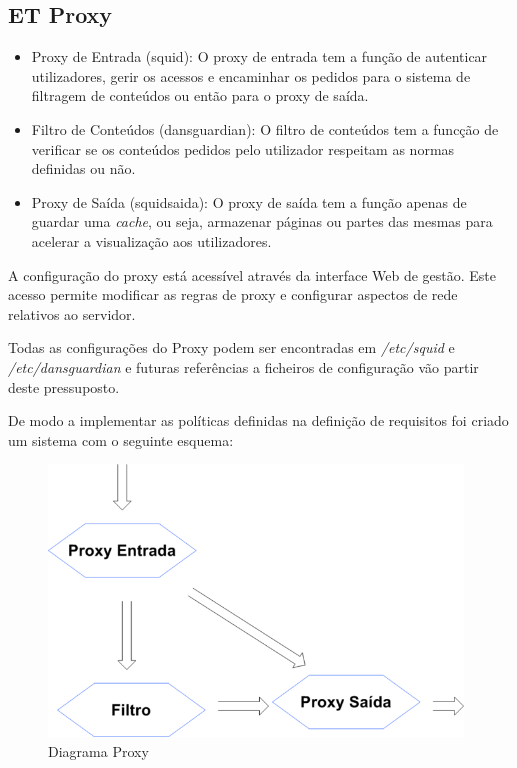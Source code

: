 \subsection{ET Proxy}
\begin{itemize}
	\item Proxy de Entrada (squid): O proxy de entrada tem a função de autenticar utilizadores, gerir os acessos e encaminhar os pedidos para o sistema de filtragem de conteúdos ou então para o proxy de saída.
	\item Filtro de Conteúdos (dansguardian): O filtro de conteúdos tem a funcção de verificar se os conteúdos pedidos pelo utilizador respeitam as normas definidas ou não.
	\item Proxy de Saída (squidsaida): O proxy de saída tem a função apenas de guardar uma \emph{cache}, ou seja, armazenar páginas ou partes das mesmas para acelerar a visualização aos utilizadores.
\end{itemize}

A configuração do proxy está acessível através da interface Web de gestão.
Este acesso permite modificar as regras de proxy e configurar aspectos de rede relativos ao servidor.

Todas as configurações do Proxy podem ser encontradas em \emph{/etc/squid} e \emph{/etc/dansguardian} e futuras referências a ficheiros de configuração vão partir deste pressuposto.

De modo a implementar as políticas definidas na definição de requisitos foi criado um sistema com o seguinte esquema:

\begin{figure}[H]
        \begin{center}
                \includegraphics[width=11cm]{include/img/squid+dansguardian+squidsaida}
        \end{center}
        \caption{Diagrama Proxy}
        \label{fig:proxy}
\end{figure}

